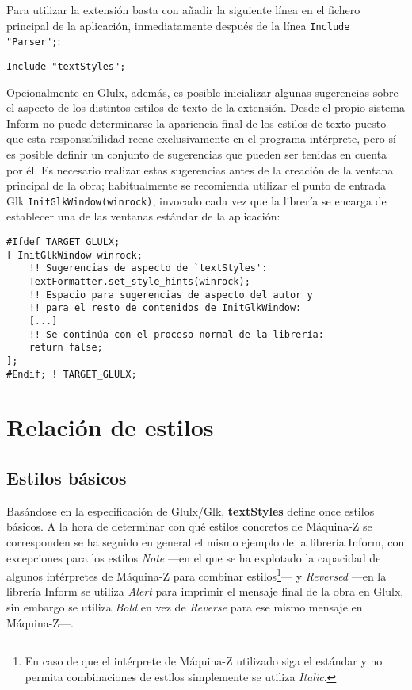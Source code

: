 \documentclass[a4paper,12pt]{article}
\numberwithin{equation}{section}
\begin{document}
Para utilizar la extensión basta con añadir la siguiente línea en el fichero principal de la aplicación, inmediatamente después de la línea \verb|Include "Parser";|:

\begin{verbatim}
Include "textStyles";
\end{verbatim}

Opcionalmente en Glulx, además, es posible inicializar algunas sugerencias sobre el aspecto de los distintos estilos de texto de la extensión. Desde el propio sistema Inform no puede determinarse la apariencia final de los estilos de texto puesto que esta responsabilidad recae exclusivamente en el programa intérprete, pero sí es posible definir un conjunto de sugerencias que pueden ser tenidas en cuenta por él. Es necesario realizar estas sugerencias antes de la creación de la ventana principal de la obra; habitualmente se recomienda utilizar el punto de entrada Glk \verb|InitGlkWindow(winrock)|, invocado cada vez que la librería se encarga de establecer una de las ventanas estándar de la aplicación\cite{PLO02}:

\begin{verbatim}
#Ifdef TARGET_GLULX;
[ InitGlkWindow winrock;
    !! Sugerencias de aspecto de `textStyles':
    TextFormatter.set_style_hints(winrock);
    !! Espacio para sugerencias de aspecto del autor y
    !! para el resto de contenidos de InitGlkWindow:
    [...]
    !! Se continúa con el proceso normal de la librería:
    return false;
];
#Endif; ! TARGET_GLULX;
\end{verbatim}



\section{Relación de estilos} \label{sec:relacion-estilos}

\subsection{Estilos básicos} \label{sec:estilos-basicos}

Basándose en la especificación de Glulx/Glk, \textbf{textStyles} define once estilos básicos. A la hora de determinar con qué estilos concretos de Máquina-Z se corresponden se ha seguido en general el mismo ejemplo de la librería Inform, con excepciones para los estilos \emph{Note} ---en el que se ha explotado la capacidad de algunos intérpretes de Máquina-Z para combinar estilos\footnote{En caso de que el intérprete de Máquina-Z utilizado siga el estándar y no permita combinaciones de estilos simplemente se utiliza \emph{Italic}.}--- y \emph{Reversed} ---en la librería Inform se utiliza \emph{Alert} para imprimir el mensaje final de la obra en Glulx, sin embargo se utiliza \emph{Bold} en vez de \emph{Reverse} para ese mismo mensaje en Máquina-Z---.
\end{document}
